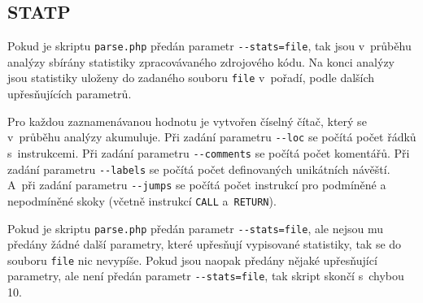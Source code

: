 \documentclass[11pt, a4paper]{article}
\begin{document}
    \subsection{STATP}
    \label{sec:statp}
    
    Pokud je skriptu \texttt{parse.php} předán parametr \texttt{-{}-stats=file},
    tak jsou v~průběhu analýzy sbírány statistiky zpracovávaného zdrojového
    kódu. Na konci analýzy jsou statistiky uloženy do zadaného souboru 
    \texttt{file} v~pořadí, podle dalších upřesňujících parametrů.
    
    Pro každou zaznamenávanou hodnotu je vytvořen číselný čítač, který se 
    v~průběhu analýzy akumuluje. Při zadání parametru \texttt{-{}-loc} se
    počítá počet řádků s~instrukcemi. Při zadání parametru \texttt{-{}-comments}
    se počítá počet komentářů. Při zadání parametru \texttt{-{}-labels} se
    počítá počet definovaných unikátních návěští. A~při zadání parametru
    \texttt{-{}-jumps} se počítá počet instrukcí pro podmíněné a nepodmíněné
    skoky (včetně instrukcí \texttt{CALL} a~\texttt{RETURN}).
    
    Pokud je skriptu \texttt{parse.php} předán parametr \texttt{-{}-stats=file},
    ale nejsou mu předány žádné další parametry, které upřesňují vypisované
    statistiky, tak se do souboru \texttt{file} nic nevypíše. Pokud jsou
    naopak předány nějaké upřesňující parametry, ale není předán parametr
    \texttt{-{}-stats=file}, tak skript skončí s~chybou 10.
\end{document}
